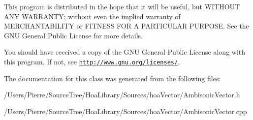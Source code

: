 This program is distributed in the hope that it will be useful, but W\-I\-T\-H\-O\-U\-T A\-N\-Y W\-A\-R\-R\-A\-N\-T\-Y; without even the implied warranty of M\-E\-R\-C\-H\-A\-N\-T\-A\-B\-I\-L\-I\-T\-Y or F\-I\-T\-N\-E\-S\-S F\-O\-R A P\-A\-R\-T\-I\-C\-U\-L\-A\-R P\-U\-R\-P\-O\-S\-E. See the G\-N\-U General Public License for more details.

You should have received a copy of the G\-N\-U General Public License along with this program. If not, see \href{http://www.gnu.org/licenses/}{\tt http\-://www.\-gnu.\-org/licenses/}. 

The documentation for this class was generated from the following files\-:\begin{DoxyCompactItemize}
\item 
/\-Users/\-Pierre/\-Source\-Tree/\-Hoa\-Library/\-Sources/hoa\-Vector/Ambisonic\-Vector.\-h\item 
/\-Users/\-Pierre/\-Source\-Tree/\-Hoa\-Library/\-Sources/hoa\-Vector/Ambisonic\-Vector.\-cpp\end{DoxyCompactItemize}
